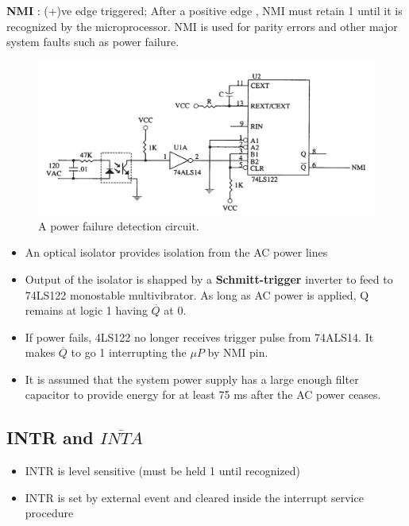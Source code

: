 \textbf{NMI} : (+)ve edge triggered; After a positive edge , NMI must retain 1 until it is recognized by the microprocessor.
NMI is used for parity errors and other major system faults such as power failure.

\begin{figure}[h!]
  \centering
  \includegraphics[width = 1\textwidth]{./figures/NMI.png}
  \caption{A power failure detection circuit.}
\end{figure}

\begin{itemize}
  \item An optical isolator provides isolation from the AC power lines
  \item Output of the isolator is shapped by a \textbf{Schmitt-trigger} inverter to feed to 74LS122 monostable multivibrator. As long as AC power is applied, Q remains at logic 1 having $\overline{Q}$ at 0.
  \item If power fails, 4LS122 no longer receives trigger pulse from 74ALS14. It makes $\overline{Q}$ to go 1 interrupting the $\mu P$ by NMI pin.
  \item It is assumed that the system power supply has a large enough filter capacitor to provide energy for at least 75 ms after the AC power ceases.
\end{itemize}
\subsection{INTR and $\overline{INTA}$}
\begin{itemize}
  \item INTR is level sensitive (must be held 1 until recognized)
  \item INTR is set by external event and cleared inside the interrupt service procedure
\end{itemize}

